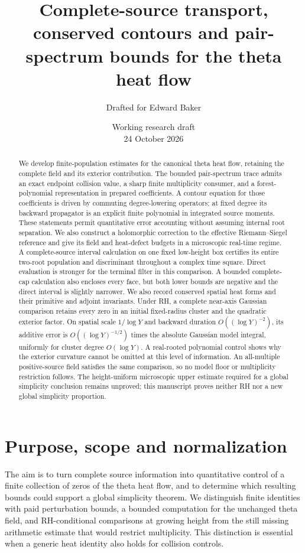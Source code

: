 \documentclass[11pt]{article}
\title{Complete-source transport, conserved contours and pair-spectrum bounds for the theta heat flow}
\author{Drafted for Edward Baker}
\date{Working research draft\\24 October 2026}
\theoremstyle{remark}
\begin{document}
\maketitle
\begin{abstract}
We develop finite-population estimates for the canonical theta heat flow,
retaining the complete field and its exterior contribution. The bounded
pair-spectrum trace admits an exact endpoint collision value, a sharp
finite multiplicity consumer, and a forest-polynomial representation in
prepared coefficients. A contour equation for those coefficients is driven
by commuting degree-lowering operators; at fixed degree its backward
propagator is an explicit finite polynomial in integrated source moments.
These statements permit quantitative error accounting without assuming
internal root separation. We also construct a holomorphic correction to
the effective Riemann--Siegel reference and give its field and heat-defect
budgets in a microscopic real-time regime. A complete-source interval
calculation on one fixed low-height box certifies its entire two-root
population and discriminant throughout a complex time square. Direct
evaluation is stronger for the terminal filter in this comparison. A bounded
complete-cap calculation also encloses every face, but both lower bounds
are negative and the direct interval is slightly narrower.
We also record conserved spatial heat forms and their primitive and
adjoint invariants. Under RH, a complete near-axis Gaussian comparison
retains every zero in an initial fixed-radius cluster and the quadratic
exterior factor. On spatial scale $1/\log Y$ and backward duration
$O((\log Y)^{-2})$, its additive error is $O((\log Y)^{-1/2})$ times the
absolute Gaussian model integral, uniformly for cluster degree $O(\log Y)$.
A real-rooted polynomial control shows why the exterior curvature cannot
be omitted at this level of information. An all-multiple positive-source
field satisfies the same comparison, so no model floor or multiplicity
restriction follows.
The height-uniform microscopic upper estimate required for a global
simplicity conclusion remains unproved; this manuscript proves neither
RH nor a new global simplicity proportion.
\end{abstract}

\section{Purpose, scope and normalization}
The aim is to turn complete source information into quantitative control
of a finite collection of zeros of the theta heat flow, and to determine
which resulting bounds could support a global simplicity theorem. We distinguish finite identities with paid perturbation bounds, a bounded
computation for the unchanged theta field, and RH-conditional comparisons
at growing height from the still missing arithmetic estimate that would
restrict multiplicity.
This distinction is essential when a generic heat identity also holds
for collision controls.
\end{document}
